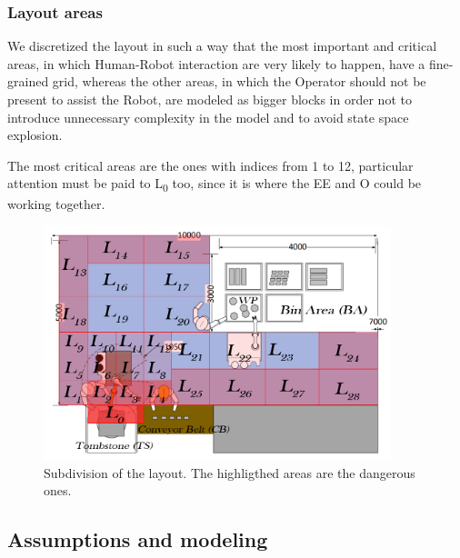 \documentclass[a4paper]{article}
\begin{document}



\subsubsection{Layout areas}
We discretized the layout in such a way that the most important and critical areas, in which Human-Robot interaction are very likely to happen, have a fine-grained grid, whereas the other areas, in which the Operator should not be present to assist the Robot, are modeled as bigger blocks in order not to introduce unnecessary complexity in the model and to avoid state space explosion.

The most critical areas are the ones with indices from 1 to 12, particular attention must be paid to L\textsubscript0 too, since it is where the EE and O could be working together. 

\begin{figure}[htp] 
\includegraphics[width=0.9\textwidth]{images/layoutnames} 
\caption{Subdivision of the layout. The highligthed areas are the dangerous ones.} 
\label{fig:layout2} 
\end{figure}

\subsection{Assumptions and modeling}
\end{document}
